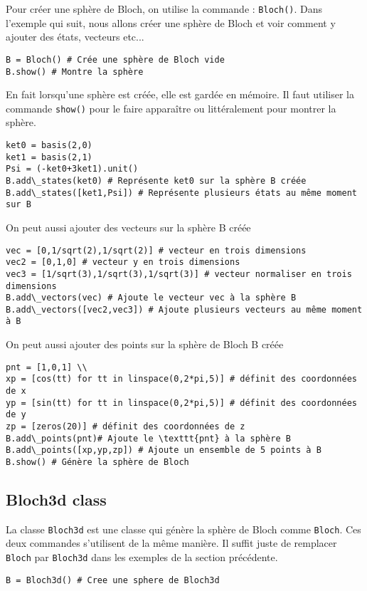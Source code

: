 Pour créer une sphère de Bloch, on utilise la commande : \texttt{Bloch()}. Dans 
l'exemple qui suit, nous allons créer une sphère de Bloch et voir comment y 
ajouter des états, vecteurs etc...\\
\begin{lstlisting}
B = Bloch() # Crée une sphère de Bloch vide
B.show() # Montre la sphère
\end{lstlisting}
En fait lorsqu'une sphère est créée, elle est gardée en mémoire. Il faut 
utiliser la commande \texttt{show()} pour le faire apparaître ou littéralement 
pour montrer la sphère.\\
\begin{lstlisting}
ket0 = basis(2,0)
ket1 = basis(2,1)
Psi = (-ket0+3ket1).unit()
B.add\_states(ket0) # Représente ket0 sur la sphère B créée
B.add\_states([ket1,Psi]) # Représente plusieurs états au même moment sur B
\end{lstlisting}
On peut aussi ajouter des vecteurs sur la sphère B créée \\
\begin{lstlisting}
vec = [0,1/sqrt(2),1/sqrt(2)] # vecteur en trois dimensions
vec2 = [0,1,0] # vecteur y en trois dimensions
vec3 = [1/sqrt(3),1/sqrt(3),1/sqrt(3)] # vecteur normaliser en trois 
dimensions
B.add\_vectors(vec) # Ajoute le vecteur vec à la sphère B
B.add\_vectors([vec2,vec3]) # Ajoute plusieurs vecteurs au même moment à B
\end{lstlisting}
On peut aussi ajouter des points sur la sphère de Bloch B créée\\
\begin{lstlisting}
pnt = [1,0,1] \\
xp = [cos(tt) for tt in linspace(0,2*pi,5)] # définit des coordonnées de x
yp = [sin(tt) for tt in linspace(0,2*pi,5)] # définit des coordonnées de y
zp = [zeros(20)] # définit des coordonnées de z
B.add\_points(pnt)# Ajoute le \texttt{pnt} à la sphère B
B.add\_points([xp,yp,zp]) # Ajoute un ensemble de 5 points à B
B.show() # Génère la sphère de Bloch
\end{lstlisting}

\subsection{Bloch3d class}

La classe \texttt{Bloch3d} est une classe qui génère la sphère de Bloch comme 
\texttt{Bloch}. Ces deux commandes s'utilisent de la même manière. Il suffit 
juste de remplacer \texttt{Bloch} par \texttt{Bloch3d} dans les exemples de la 
section précédente.
\begin{lstlisting}
B = Bloch3d() # Cree une sphere de Bloch3d
\end{lstlisting}

